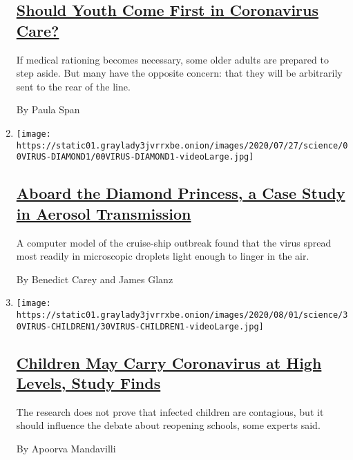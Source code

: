 \begin{enumerate}
  \hypertarget{should-youth-come-first-in-coronavirus-care}{%
  \subsection{\texorpdfstring{\href{/2020/07/31/health/coronavirus-ethics-rationing-elderly.html}{Should
  Youth Come First in Coronavirus
  Care?}}{Should Youth Come First in Coronavirus Care?}}\label{should-youth-come-first-in-coronavirus-care}}

  If medical rationing becomes necessary, some older adults are prepared
  to step aside. But many have the opposite concern: that they will be
  arbitrarily sent to the rear of the line.

  By Paula Span
\item
  \texttt{[image: https://static01.graylady3jvrrxbe.onion/images/2020/07/27/science/00VIRUS-DIAMOND1/00VIRUS-DIAMOND1-videoLarge.jpg]}

  \hypertarget{aboard-the-diamond-princess-a-case-study-in-aerosol-transmission}{%
  \subsection{\texorpdfstring{\href{/2020/07/30/health/diamond-princess-coronavirus-aerosol.html}{Aboard
  the Diamond Princess, a Case Study in Aerosol
  Transmission}}{Aboard the Diamond Princess, a Case Study in Aerosol Transmission}}\label{aboard-the-diamond-princess-a-case-study-in-aerosol-transmission}}

  A computer model of the cruise-ship outbreak found that the virus
  spread most readily in microscopic droplets light enough to linger in
  the air.

  By Benedict Carey and James Glanz
\item
  \texttt{[image: https://static01.graylady3jvrrxbe.onion/images/2020/08/01/science/30VIRUS-CHILDREN1/30VIRUS-CHILDREN1-videoLarge.jpg]}

  \hypertarget{children-may-carry-coronavirus-at-high-levels-study-finds}{%
  \subsection{\texorpdfstring{\href{/2020/07/30/health/coronavirus-children.html}{Children
  May Carry Coronavirus at High Levels, Study
  Finds}}{Children May Carry Coronavirus at High Levels, Study Finds}}\label{children-may-carry-coronavirus-at-high-levels-study-finds}}

  The research does not prove that infected children are contagious, but
  it should influence the debate about reopening schools, some experts
  said.

  By Apoorva Mandavilli
\end{enumerate}

